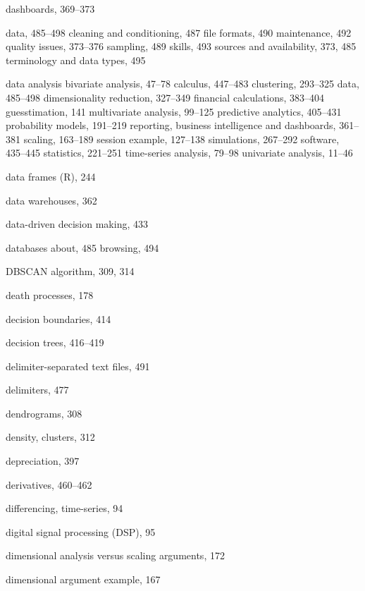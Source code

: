 \documentclass{Oreilly5980006}
\begin{document}
\begin{theindex}
  \indexspace

  \item dashboards, 369--373
  \item data, 485--498
    \subitem cleaning and conditioning, 487
    \subitem file formats, 490
    \subitem maintenance, 492
    \subitem quality issues, 373--376
    \subitem sampling, 489
    \subitem skills, 493
    \subitem sources and availability, 373, 485
    \subitem terminology and data types, 495
  \item data analysis
    \subitem bivariate analysis, 47--78
    \subitem calculus, 447--483
    \subitem clustering, 293--325
    \subitem data, 485--498
    \subitem dimensionality reduction, 327--349
    \subitem financial calculations, 383--404
    \subitem guesstimation, 141
    \subitem multivariate analysis, 99--125
    \subitem predictive analytics, 405--431
    \subitem probability models, 191--219
    \subitem reporting, business intelligence and dashboards, 361--381
    \subitem scaling, 163--189
    \subitem session example, 127--138
    \subitem simulations, 267--292
    \subitem software, 435--445
    \subitem statistics, 221--251
    \subitem time-series analysis, 79--98
    \subitem univariate analysis, 11--46
  \item data frames  (R), 244
  \item data warehouses, 362
  \item data-driven decision making, 433
  \item databases
    \subitem about, 485
    \subitem browsing, 494
  \item DBSCAN algorithm, 309, 314
  \item death processes, 178
  \item decision boundaries, 414
  \item decision trees, 416--419
  \item delimiter-separated text files, 491
  \item delimiters, 477
  \item dendrograms, 308
  \item density, clusters, 312
  \item depreciation, 397
  \item derivatives, 460--462
  \item differencing, time-series, 94
  \item digital signal processing (DSP), 95
  \item dimensional analysis versus scaling arguments, 172
  \item dimensional argument example, 167

\end{theindex}
\end{document}

